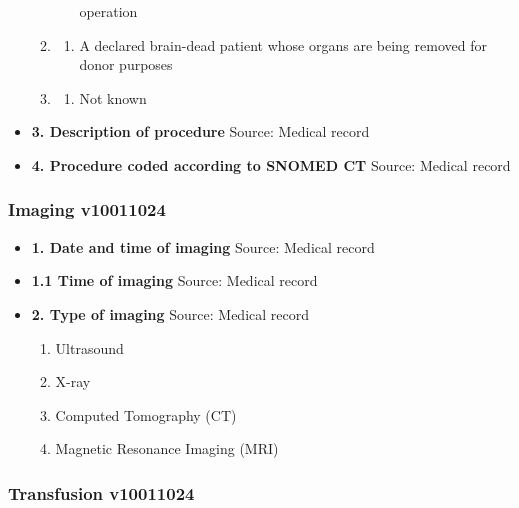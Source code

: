 \documentclass[
]{scrartcl}
\providecommand{\tightlist}{%
  \setlength{\itemsep}{0pt}\setlength{\parskip}{0pt}}\usepackage{longtable,booktabs,array}
\begin{document}
\begin{itemize}
\begin{enumerate}
\begin{enumerate}
      operation
    \end{enumerate}
  \item
    \begin{enumerate}
    \def\labelenumii{\arabic{enumii}.}
    \setcounter{enumii}{5}
    \tightlist
    \item
      A declared brain-dead patient whose organs are being removed for
      donor purposes
    \end{enumerate}
  \item
    \begin{enumerate}
    \def\labelenumii{\arabic{enumii}.}
    \setcounter{enumii}{998}
    \tightlist
    \item
      Not known
    \end{enumerate}
  \end{enumerate}
\item
  \textbf{3. Description of procedure} Source: Medical record
\item
  \textbf{4. Procedure coded according to SNOMED CT} Source: Medical
  record
\end{itemize}

\hypertarget{imaging-v10011024}{%
\subsubsection{Imaging v10011024}\label{imaging-v10011024}}

\begin{itemize}
\item
  \textbf{1. Date and time of imaging} Source: Medical record
\item
  \textbf{1.1 Time of imaging} Source: Medical record
\item
  \textbf{2. Type of imaging} Source: Medical record

  \begin{enumerate}
  \def\labelenumi{\arabic{enumi}.}
  \tightlist
  \item
    Ultrasound
  \item
    X-ray
  \item
    Computed Tomography (CT)
  \item
    Magnetic Resonance Imaging (MRI)
  \end{enumerate}
\end{itemize}

\hypertarget{transfusion-v10011024}{%
\subsubsection{Transfusion v10011024}\label{transfusion-v10011024}}
\end{document}
